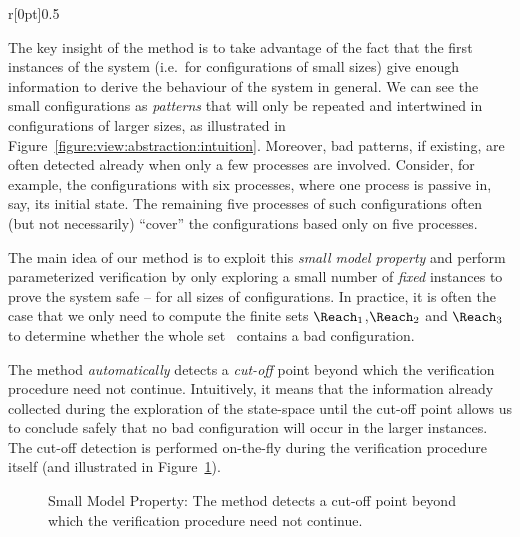 %
%
\begin{wrapfigure}{r}[0pt]{0.5\linewidth}
  \vspace{-\baselineskip}
  \hfill
  \caption{Repeated patterns.}
  \label{figure:view:abstraction:intuition}
\end{wrapfigure}
%
The key insight of the method is to take advantage of the fact that
the first instances of the system (i.e.\ for configurations of small
sizes) give enough information to derive the behaviour of the system
in general.
%
We can see the small configurations as \emph{patterns} that will only
be repeated and intertwined in configurations of larger sizes, as
illustrated in Figure~\ref{figure:view:abstraction:intuition}.
%
Moreover, bad patterns, if existing, are often detected already when
only a few processes are involved.
%
Consider, for example, the configurations with six processes, where
one process is passive in, say, its initial state. The remaining five
processes of such configurations often (but not necessarily) ``cover''
the configurations based only on five processes.
%


%
%
The main idea of our method is to exploit this %
\emph{small model property} and perform parameterized verification by
only exploring a small number of \emph{fixed} instances %
to prove the system safe -- for all sizes of configurations. In
practice, it is often the case that we only need to compute the finite
sets $\Reach_1$,$\Reach_2$ and $\Reach_3$ to determine whether the
whole set \Reach\ contains a bad configuration.

%
The method \emph{automatically} detects a \emph{\mbox{cut-off}} point
beyond which the verification procedure need not continue.
%
Intuitively, it means that the information already collected during
the exploration of the state-space until the \mbox{cut-off} point
allows us to conclude safely that no bad configuration will occur in
the larger instances.
%
The cut-off detection is performed on-the-fly during the verification
procedure itself (and illustrated in
Figure~\ref{figure:small:model:property}).

\begingroup%
\setlength\intextsep{\dazintextsep}
\begin{figure}[ht]
  \centering
  \caption{Small Model Property: The method detects a cut-off point
    beyond which the verification procedure need not continue.}
  \label{figure:small:model:property}
\end{figure}
\endgroup

